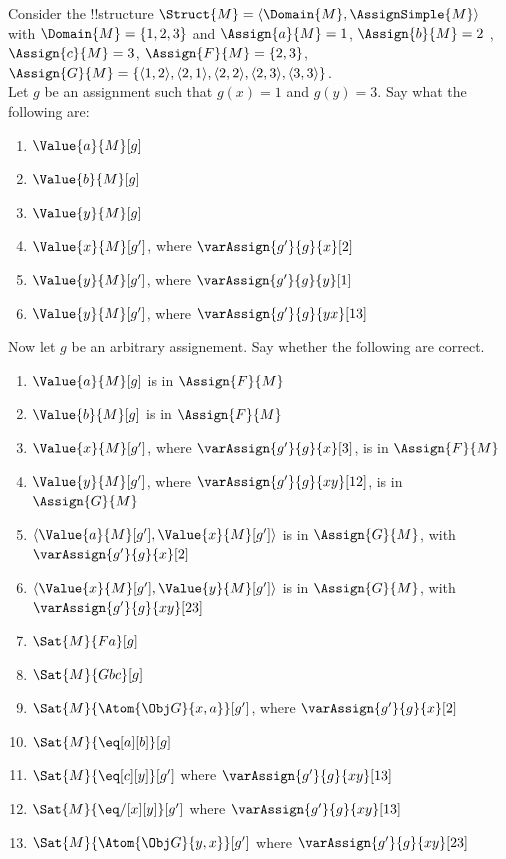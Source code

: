\documentclass[../../../../include/open-logic-section]{subfiles}
\begin{document}
\begin{prob}
Consider the !!{structure} $\Struct{M}=\langle\Domain{M},\AssignSimple{M}\rangle$
with $\Domain{M}=\{1,2,3\}$ and $\Assign{a}{M}=1$, $\Assign{b}{M}=2$
, $\Assign{c}{M}=3$, $\Assign{F}{M}=\{2,3\}$, $\Assign{G}{M}=\{\langle1,2\rangle,\langle2,1\rangle,\langle2,2\rangle,\langle2,3\rangle,\langle3,3\rangle\}$. \\
Let $g$ be an assignment such that $g(x)=1$ and $g(y)=3$. Say what
the following are:
\begin{enumerate}
	\item $\Value{a}{M}[g]$
	\item $\Value{b}{M}[g]$
	\item $\Value{y}{M}[g]$
	\item $\Value{x}{M}[g']$, where $\varAssign{g'}{g}{x}[2]$
	\item $\Value{y}{M}[g']$, where $\varAssign{g'}{g}{y}[1]$
	\item $\Value{y}{M}[g']$, where $\varAssign{g'}{g}{yx}[13]$
\end{enumerate}
Now let $g$ be an arbitrary assignement. Say whether the following
are correct.
\begin{enumerate}
	\item $\Value{a}{M}[g]$ is in $\Assign{F}{M}$
	\item $\Value{b}{M}[g]$ is in $\Assign{F}{M}$
	\item $\Value{x}{M}[g']$, where $\varAssign{g'}{g}{x}[3]$, is in $\Assign{F}{M}$
	\item $\Value{y}{M}[g']$, where $\varAssign{g'}{g}{xy}[12]$, is in $\Assign{G}{M}$
	\item $\langle\Value{a}{M}[g'], \Value{x}{M}[g']\rangle$ is in $\Assign{G}{M}$, with $\varAssign{g'}{g}{x}[2]$
	\item $\langle\Value{x}{M}[g'], \Value{y}{M}[g']\rangle$ is in $\Assign{G}{M}$, with $\varAssign{g'}{g}{xy}[23]$
	\item $\Sat{M}{Fa}[g]$
	\item $\Sat{M}{Gbc}[g]$
	\item $\Sat{M}{\Atom{\Obj G}{x,a}}[g']$, where $\varAssign{g'}{g}{x}[2]$
	\item $\Sat{M}{\eq[a][b]}[g]$
	\item $\Sat{M}{\eq[c][y]}[g']$ where $\varAssign{g'}{g}{xy}[13]$
	\item $\Sat{M}{\eq/[x][y]}[g']$ where $\varAssign{g'}{g}{xy}[13]$
	\item $\Sat{M}{\Atom{\Obj G}{y,x}}[g']$ where $\varAssign{g'}{g}{xy}[23]$

\end{enumerate}
\end{prob}
\end{document}
